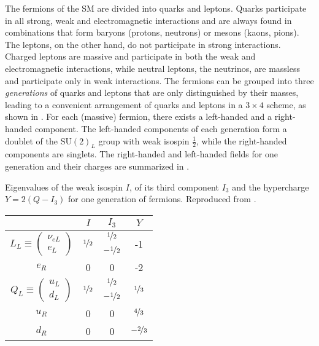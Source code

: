 The fermions of the SM are divided into quarks and leptons.
Quarks participate in all strong, weak and electromagnetic interactions and are always found in combinations that form baryons (protons, neutrons) or mesons (kaons, pions).
The leptons, on the other hand, do not participate in strong interactions.
Charged leptons are massive and participate in both the weak and electromagnetic interactions, while neutral leptons, the neutrinos, are massless and participate only in weak interactions.
The fermions can be grouped into three \emph{generations} of quarks and leptons that are only distinguished by their masses, leading to a convenient arrangement of quarks and leptons in a $3\times4$ scheme, as shown in .
For each (massive) fermion, there exists a left-handed and a right-handed component.
The left-handed components of each generation form a doublet of the $\mathrm{SU}(2)_L$ group with weak isospin $\frac{1}{2}$, while the right-handed components are singlets.
The right-handed and left-handed fields for one generation and their charges are summarized in .
\begin{margintable}
    \caption{Eigenvalues of the weak isospin $I$, of its third component $I_3$ and the hypercharge $Y = 2(Q - I_3)$ for one generation of fermions. Reproduced from \cite{giunti-kim-neutrino}.}
    \label{tab:fermions-one-generation}
    \centering
    \begin{tabular}{cccc} \toprule
    & $I$ & $I_3$ & $Y$ \\ \midrule
    \multirow{2}{*}{$L_L \equiv \begin{pmatrix} \nu_{eL} \\ e_L \end{pmatrix}$} & \multirow{2}{*}{$\nicefrac{1}{2}$} & $\nicefrac{1}{2}$ & \multirow{2}{*}{-1}\\
    & & $-\nicefrac{1}{2}$ & \\ \midrule
    $e_R$ & 0 & 0 & -2 \\ \midrule
    \multirow{2}{*}{$Q_L \equiv \begin{pmatrix} u_L \\ d_L \end{pmatrix}$} & \multirow{2}{*}{$\nicefrac{1}{2}$} & $\nicefrac{1}{2}$ & \multirow{2}{*}{$\nicefrac{1}{3}$}\\
    & & $-\nicefrac{1}{2}$ & \\ \midrule
    $u_R$ & 0 & 0 & $\nicefrac{4}{3}$ \\
    $d_R$ & 0 & 0 & $-\nicefrac{2}{3}$ \\\bottomrule
    \end{tabular}
\end{margintable}

